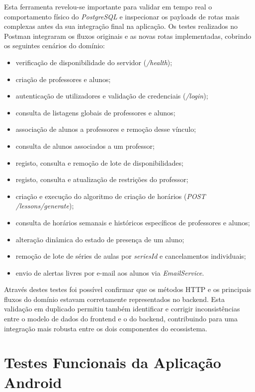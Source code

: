 Esta ferramenta revelou-se importante para validar em tempo real o comportamento físico do \textit{PostgreSQL} e inspecionar os payloads de rotas mais complexas antes da sua integração final na aplicação.
Os testes realizados no Postman integraram os fluxos originais e as novas rotas implementadas, cobrindo os seguintes cenários do domínio:

\begin{itemize}
    \item verificação de disponibilidade do servidor (\textit{/health});
    \item criação de professores e alunos;
    \item autenticação de utilizadores e validação de credenciais (\textit{/login});
    \item consulta de listagens globais de professores e alunos;
    \item associação de alunos a professores e remoção desse vínculo;
    \item consulta de alunos associados a um professor;
    \item registo, consulta e remoção de lote de disponibilidades;
    \item registo, consulta e atualização de restrições do professor;
    \item criação e execução do algoritmo de criação de horários (\textit{POST /lessons/generate});
    \item consulta de horários semanais e históricos específicos de professores e alunos;
    \item alteração dinâmica do estado de presença de um aluno;
    \item remoção de lote de séries de aulas por \textit{seriesId} e cancelamentos individuais;
    \item envio de alertas livres por e-mail aos alunos via \textit{EmailService}.
\end{itemize}

Através destes testes foi possível confirmar que os métodos HTTP e os principais fluxos do domínio estavam corretamente representados no backend. Esta validação em duplicado permitiu também identificar e corrigir inconsistências entre o modelo de dados do frontend e o do backend, contribuindo para uma integração mais robusta entre os dois componentes do ecossistema.


\section{Testes Funcionais da Aplicação Android}

